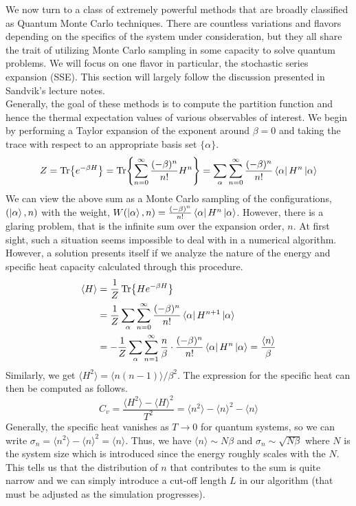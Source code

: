 We now turn to a class of extremely powerful methods that are broadly classified as Quantum Monte Carlo techniques. There are countless variations and flavors\cite{Pollet_2012, Austin2012} depending on the specifics of the system under consideration, but they all share the trait of utilizing Monte Carlo sampling in some capacity to solve quantum problems. We will focus on one flavor in particular, the stochastic series expansion (SSE)\cite{sandvik2019stochastic}. This section will largely follow the discussion presented in Sandvik's lecture notes\cite{Sandvik_2010}.
\vspace{0.5cm}\\
Generally, the goal of these methods is to compute the partition function and hence the thermal expectation values of various observables of interest. We begin by performing a Taylor expansion of the exponent around $\beta = 0$ and taking the trace with respect to an appropriate basis set $\{\alpha\}$.
\begin{equation}
    Z = \Tr{e^{-\beta H}} = \Tr{\sum_{n = 0}^{\infty} \frac{(-\beta)^n}{n!}H^n} = \sum_{\alpha} \sum_{n = 0}^{\infty} \frac{(-\beta)^n}{n!}\bra{\alpha}H^n\ket{\alpha}
\end{equation}
We can view the above sum as a Monte Carlo sampling of the configurations, $(\ket{\alpha}, n)$ with the weight, $W(\ket{\alpha}, n) = \frac{(-\beta)^n}{n!}\bra{\alpha} H^n \ket{\alpha}$. However, there is a glaring problem, that is the infinite sum over the expansion order, $n$. At first sight, such a situation seems impossible to deal with in a numerical algorithm. However, a solution presents itself if we analyze the nature of the energy and specific heat capacity calculated through this procedure.
\begin{align}\label{eq:mc_energy}
    \langle H \rangle &= \frac{1}{Z}\Tr{He^{-\beta H}} \nonumber\\
    &= \frac{1}{Z}\sum_{\alpha} \sum_{n = 0}^{\infty} \frac{(-\beta)^n}{n!}\bra{\alpha}H^{n+1}\ket{\alpha} \nonumber\\
    &= -\frac{1}{Z}\sum_{\alpha} \sum_{n = 1}^{\infty} \frac{n}{\beta} \cdot \frac{(-\beta)^n}{n!}\bra{\alpha}H^{n}\ket{\alpha} = \frac{\langle n \rangle}{\beta}
\end{align}
Similarly, we get $\langle H^2 \rangle = \langle n(n-1)\rangle/\beta^2$. The expression for the specific heat can then be computed as follows.
\begin{equation}
    C_v = \frac{\langle H^2 \rangle - \langle H \rangle^2}{T^2} = \langle n^2 \rangle - \langle n \rangle^2 - \langle n \rangle
\end{equation}
Generally, the specific heat vanishes as $T \to 0$ for quantum systems, so we can write $\sigma_n = \langle n^2 \rangle - \langle n \rangle^2 = \langle n \rangle$. Thus, we have $\langle n \rangle \sim N\beta$ and $\sigma_n \sim \sqrt{N\beta}$ where $N$ is the system size which is introduced since the energy roughly scales with the $N$. This tells us that the distribution of $n$ that contributes to the sum is quite narrow and we can simply introduce a cut-off length $L$ in our algorithm (that must be adjusted as the simulation progresses). 

